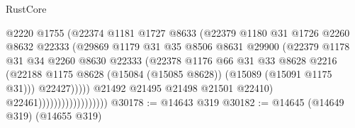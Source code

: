 \begin{lexlean}{RustCore}
\begin{coremodule}
                                          @2220
                                          @1755
                                          (@22374
                                            @1181
                                            @1727
                                            @8633
                                            (@22379
                                              @1180
                                              @31
                                              @1726
                                              @2260
                                              @8632
                                              @22333
                                              (@29869
                                                @1179
                                                @31
                                                @35
                                                @8506
                                                @8631
                                                @29900
                                                (@22379
                                                  @1178
                                                  @31
                                                  @34
                                                  @2260
                                                  @8630
                                                  @22333
                                                  (@22378
                                                    @1176
                                                    @66
                                                    @31
                                                    @33
                                                    @8628
                                                    @2216
                                                    (@22188
                                                      @1175
                                                      @8628
                                                      (@15084 (@15085 @8628))
                                                      (@15089 (@15091 @1175 @31)))
                                                    @22427)))))
                                          @21492
                                          @21495
                                          @21498
                                          @21501
                                          @22410)
                                        @22461))))))))))))))))))
@30178 := @14643 @319
@30182 := @14645 (@14649 @319) (@14655 @319)

\end{coremodule}
\end{lexlean}
